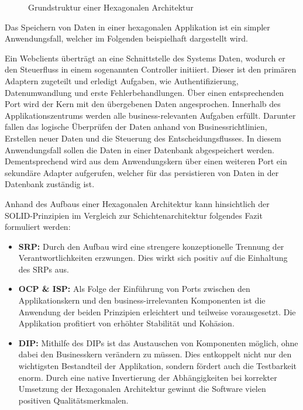 \begin{figure}[htbp]
	\centering
	
	\caption{Grundstruktur einer Hexagonalen Architektur}
	\label{fig:HexagonaleArchitektur}
\end{figure}

Das Speichern von Daten in einer hexagonalen Applikation ist ein simpler Anwendungsfall, welcher im Folgenden beispielhaft dargestellt wird. 

Ein Webclients überträgt an eine Schnittstelle des Systems Daten, wodurch er den Steuerfluss in einem sogenannten Controller initiiert. Dieser ist den primären Adaptern zugeteilt und erledigt Aufgaben, wie Authentifizierung, Datenumwandlung und erste Fehlerbehandlungen. Über einen entsprechenden Port wird der Kern mit den übergebenen Daten angesprochen. Innerhalb des Applikationszentrums werden alle business-relevanten Aufgaben erfüllt. Darunter fallen das logische Überprüfen der Daten anhand von Businessrichtlinien, Erstellen neuer Daten und die Steuerung des Entscheidungsflusses. In diesem Anwendungsfall sollen die Daten in einer Datenbank abgespeichert werden. Dementsprechend wird aus dem Anwendungskern über einen weiteren Port ein sekundäre Adapter aufgerufen, welcher für das persistieren von Daten in der Datenbank zuständig ist. 

Anhand des Aufbaus einer Hexagonalen Architektur kann hinsichtlich der SOLID-Prinzipien im Vergleich zur Schichtenarchitektur folgendes Fazit formuliert werden:

\begin{itemize}[noitemsep,nolistsep,topsep=-2pt]
	\item \textbf{\acrshort{SRP}: } {Durch den Aufbau wird eine strengere konzeptionelle Trennung der Verantwortlichkeiten erzwungen. Dies wirkt sich positiv auf die Einhaltung des \acrlong{SRP}s aus.}
	\item \textbf{\acrshort{OCP} \& \acrshort{ISP}: } {Als Folge der Einführung von Ports zwischen den Applikationskern und den business-irrelevanten Komponenten ist die Anwendung der beiden Prinzipien erleichtert und teilweise vorausgesetzt. Die Applikation profitiert von erhöhter Stabilität und Kohäsion. }
	\item \textbf{\acrshort{DIP}: } {Mithilfe des \acrlong{DIP}s ist das Austauschen von Komponenten möglich, ohne dabei den Businesskern verändern zu müssen. Dies entkoppelt nicht nur den wichtigsten Bestandteil der Applikation, sondern fördert auch die Testbarkeit enorm. Durch eine native Invertierung der Abhängigkeiten bei korrekter Umsetzung der Hexagonalen Architektur gewinnt die Software vielen positiven Qualitätsmerkmalen.}
\end{itemize}


